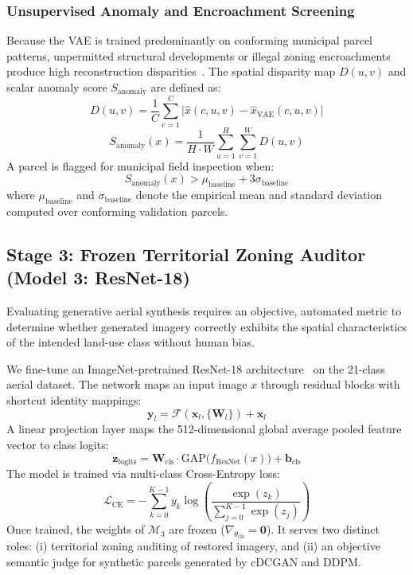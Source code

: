 \documentclass[journal]{IEEEtran}
\begin{document}
\subsubsection{Unsupervised Anomaly and Encroachment Screening}
Because the VAE is trained predominantly on conforming municipal parcel patterns, unpermitted structural developments or illegal zoning encroachments produce high reconstruction disparities~\cite{an2015variational,akcay2018ganomaly}. The spatial disparity map $D(u, v)$ and scalar anomaly score $S_{\text{anomaly}}$ are defined as:
\begin{equation}
D(u, v) = \frac{1}{C}\sum_{c=1}^C \big|\hat{x}(c, u, v) - \hat{x}_{\text{VAE}}(c, u, v)\big|
\label{eq:disparity_map}
\end{equation}
\begin{equation}
S_{\text{anomaly}}(x) = \frac{1}{H \cdot W} \sum_{u=1}^H \sum_{v=1}^W D(u, v)
\label{eq:anomaly_score}
\end{equation}
A parcel is flagged for municipal field inspection when:
\begin{equation}
S_{\text{anomaly}}(x) > \mu_{\text{baseline}} + 3\sigma_{\text{baseline}}
\label{eq:anomaly_thresh}
\end{equation}
where $\mu_{\text{baseline}}$ and $\sigma_{\text{baseline}}$ denote the empirical mean and standard deviation computed over conforming validation parcels.

\subsection{Stage 3: Frozen Territorial Zoning Auditor (Model 3: ResNet-18)}
Evaluating generative aerial synthesis requires an objective, automated metric to determine whether generated imagery correctly exhibits the spatial characteristics of the intended land-use class without human bias.

We fine-tune an ImageNet-pretrained ResNet-18 architecture~\cite{he2016deep} on the 21-class aerial dataset. The network maps an input image $x$ through residual blocks with shortcut identity mappings:
\begin{equation}
\mathbf{y}_l = \mathcal{F}(\mathbf{x}_l, \{\mathbf{W}_l\}) + \mathbf{x}_l
\label{eq:resnet_shortcut}
\end{equation}
A linear projection layer maps the 512-dimensional global average pooled feature vector to class logits:
\begin{equation}
\mathbf{z}_{\text{logits}} = \mathbf{W}_{\text{cls}} \cdot \text{GAP}\big(f_{\text{ResNet}}(x)\big) + \mathbf{b}_{\text{cls}}
\end{equation}
The model is trained via multi-class Cross-Entropy loss:
\begin{equation}
\mathcal{L}_{\text{CE}} = - \sum_{k=0}^{K-1} y_k \log\left(\frac{\exp(z_k)}{\sum_{j=0}^{K-1} \exp(z_j)}\right)
\label{eq:ce_loss}
\end{equation}
Once trained, the weights of $\mathcal{M}_3$ are frozen ($\nabla_{\theta_{\text{cls}}} = \mathbf{0}$). It serves two distinct roles: (i) territorial zoning auditing of restored imagery, and (ii) an objective semantic judge for synthetic parcels generated by cDCGAN and DDPM.
\end{document}
